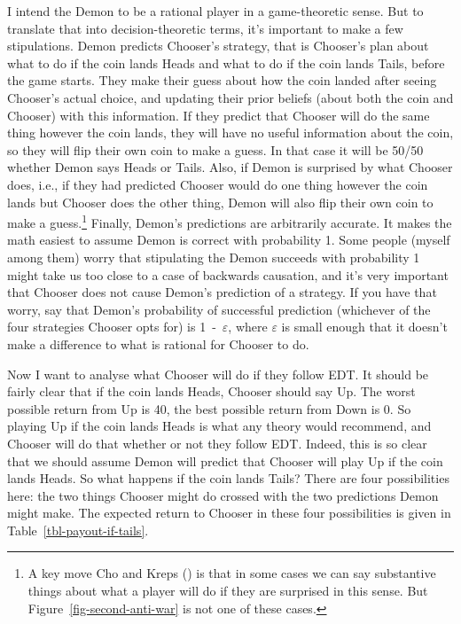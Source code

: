 \documentclass[
  11pt,
  letterpaper,
  DIV=11,
  numbers=noendperiod,
  twoside]{scrartcl}
\begin{document}
I intend the Demon to be a rational player in a game-theoretic sense.
But to translate that into decision-theoretic terms, it's important to
make a few stipulations. Demon predicts Chooser's strategy, that is
Chooser's plan about what to do if the coin lands Heads and what to do
if the coin lands Tails, before the game starts. They make their guess
about how the coin landed after seeing Chooser's actual choice, and
updating their prior beliefs (about both the coin and Chooser) with this
information. If they predict that Chooser will do the same thing however
the coin lands, they will have no useful information about the coin, so
they will flip their own coin to make a guess. In that case it will be
50/50 whether Demon says Heads or Tails. Also, if Demon is surprised by
what Chooser does, i.e., if they had predicted Chooser would do one
thing however the coin lands but Chooser does the other thing, Demon
will also flip their own coin to make a guess.\footnote{A key move Cho
  and Kreps () is that in some cases we
  can say substantive things about what a player will do if they are
  surprised in this sense. But Figure~\ref{fig-second-anti-war} is not
  one of these cases.} Finally, Demon's predictions are arbitrarily
accurate. It makes the math easiest to assume Demon is correct with
probability 1. Some people (myself among them) worry that stipulating
the Demon succeeds with probability 1 might take us too close to a case
of backwards causation, and it's very important that Chooser does not
cause Demon's prediction of a strategy. If you have that worry, say that
Demon's probability of successful prediction (whichever of the four
strategies Chooser opts for) is 1~-~\(\varepsilon\), where
\(\varepsilon\) is small enough that it doesn't make a difference to
what is rational for Chooser to do.

Now I want to analyse what Chooser will do if they follow EDT. It should
be fairly clear that if the coin lands Heads, Chooser should say Up. The
worst possible return from Up is 40, the best possible return from Down
is 0. So playing Up if the coin lands Heads is what any theory would
recommend, and Chooser will do that whether or not they follow EDT.
Indeed, this is so clear that we should assume Demon will predict that
Chooser will play Up if the coin lands Heads. So what happens if the
coin lands Tails? There are four possibilities here: the two things
Chooser might do crossed with the two predictions Demon might make. The
expected return to Chooser in these four possibilities is given in
Table~\ref{tbl-payout-if-tails}.
\end{document}
